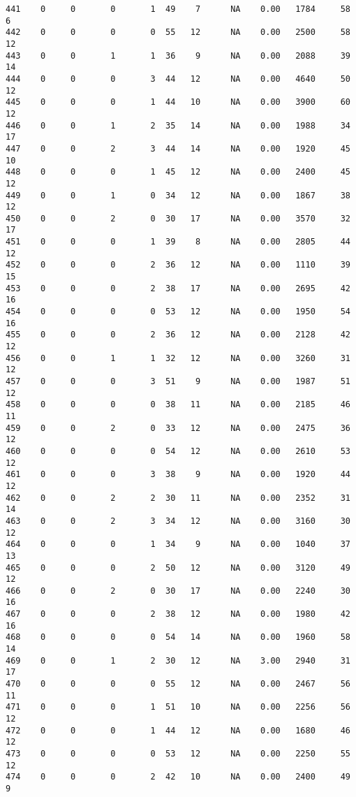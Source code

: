 \documentclass[
  letterpaper,
  DIV=11,
  numbers=noendperiod]{scrreprt}
\begin{document}
\begin{verbatim}
441    0     0       0       1  49    7      NA    0.00   1784     58       6
442    0     0       0       0  55   12      NA    0.00   2500     58      12
443    0     0       1       1  36    9      NA    0.00   2088     39      14
444    0     0       0       3  44   12      NA    0.00   4640     50      12
445    0     0       0       1  44   10      NA    0.00   3900     60      12
446    0     0       1       2  35   14      NA    0.00   1988     34      17
447    0     0       2       3  44   14      NA    0.00   1920     45      10
448    0     0       0       1  45   12      NA    0.00   2400     45      12
449    0     0       1       0  34   12      NA    0.00   1867     38      12
450    0     0       2       0  30   17      NA    0.00   3570     32      17
451    0     0       0       1  39    8      NA    0.00   2805     44      12
452    0     0       0       2  36   12      NA    0.00   1110     39      15
453    0     0       0       2  38   17      NA    0.00   2695     42      16
454    0     0       0       0  53   12      NA    0.00   1950     54      16
455    0     0       0       2  36   12      NA    0.00   2128     42      12
456    0     0       1       1  32   12      NA    0.00   3260     31      12
457    0     0       0       3  51    9      NA    0.00   1987     51      12
458    0     0       0       0  38   11      NA    0.00   2185     46      11
459    0     0       2       0  33   12      NA    0.00   2475     36      12
460    0     0       0       0  54   12      NA    0.00   2610     53      12
461    0     0       0       3  38    9      NA    0.00   1920     44      12
462    0     0       2       2  30   11      NA    0.00   2352     31      14
463    0     0       2       3  34   12      NA    0.00   3160     30      12
464    0     0       0       1  34    9      NA    0.00   1040     37      13
465    0     0       0       2  50   12      NA    0.00   3120     49      12
466    0     0       2       0  30   17      NA    0.00   2240     30      16
467    0     0       0       2  38   12      NA    0.00   1980     42      16
468    0     0       0       0  54   14      NA    0.00   1960     58      14
469    0     0       1       2  30   12      NA    3.00   2940     31      17
470    0     0       0       0  55   12      NA    0.00   2467     56      11
471    0     0       0       1  51   10      NA    0.00   2256     56      12
472    0     0       0       1  44   12      NA    0.00   1680     46      12
473    0     0       0       0  53   12      NA    0.00   2250     55      12
474    0     0       0       2  42   10      NA    0.00   2400     49       9

\end{verbatim}
\end{document}
